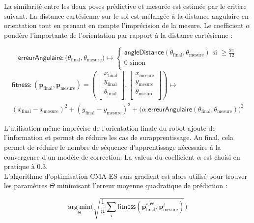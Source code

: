 La similarité entre les deux poses prédictive et mesurée est estimée par le critère suivant.
La distance cartésienne sur le sol est mélangée à la distance angulaire en orientation 
tout en prenant en compte l'imprécision de la mesure.
Le coefficient $\alpha$ pondère l'importante de l'orientation par rapport à la distance 
cartésienne :

$$
\mathsf{erreurAngulaire} : 
\big( \theta_{\text{final}}, \theta_{\text{mesure}} \big) 
\longmapsto 
\begin{cases}
    \mathsf{angleDistance}(\theta_{\text{final}}, \theta_{\text{mesure}})
    \text{ si } \geqslant \frac{2\pi}{12} \\
    0 \text{ sinon} \\
\end{cases}
$$
\begin{gather*}
\mathsf{fitness} : 
\left( \bm{p}_{\text{final}}, \bm{p}_{\text{mesure}} \right)
=
\left( \begin{bmatrix} x_{\text{final}}\\ y_{\text{final}}\\ \theta_{\text{final}}\\ \end{bmatrix}, 
\begin{bmatrix} x_{\text{mesure}}\\ y_{\text{mesure}}\\ \theta_{\text{mesure}}\\ \end{bmatrix} \right)
\longmapsto \\
(x_{\text{final}} - x_{\text{mesure}})^{2} + (y_{\text{final}} - y_{\text{mesure}})^{2}
+ \big( \alpha.\mathsf{erreurAngulaire}(\theta_{\text{final}}, \theta_{\text{mesure}}) \big)^{2}
\end{gather*}

L'utilisation même imprécise de l'orientation finale du robot ajoute de l'information 
et permet de réduire les cas de surapprentissage.
Au final, cela permet de réduire le nombre de séquence d'apprentissage
nécessaire à la convergence d'un modèle de correction.
La valeur du coefficient $\alpha$ est choisi en pratique à $0.3$.\\

L'algorithme d'optimisation CMA-ES sans gradient est alors utilisé pour 
trouver les paramètres $\Theta$ minimisant l'erreur moyenne quadratique de prédiction :

$$
\underset{\Theta}{\mathrm{arg~min}} 
\big( \sqrt{\frac{1}{n}\sum_{i} \mathsf{fitness}(\bm{p}_{\text{final}}^{i, \Theta}, \bm{p}_{\text{mesure}}^{i})} \big)
$$

